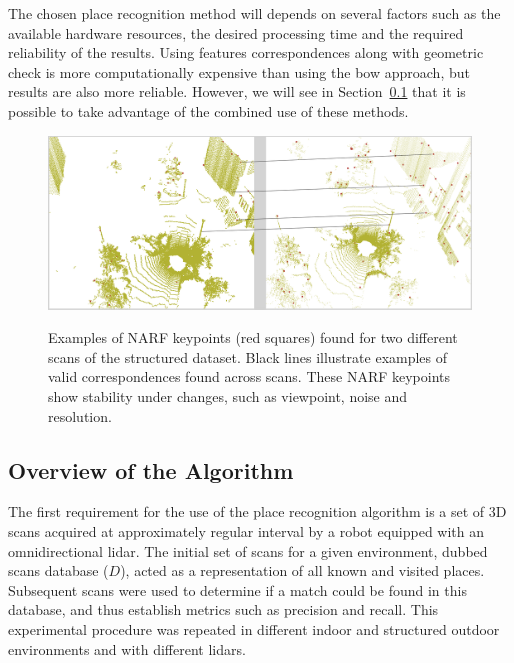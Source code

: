 The chosen place recognition method will depends on several factors such as the available hardware resources, the desired processing time and the required reliability of the results. Using features correspondences along with geometric check is more computationally expensive than using the \gls*{bow} approach, but results are also more reliable. However, we will see in Section~\ref{ssec:chap_slam_algo} that it is possible to take advantage of the combined use of these methods.

\begin{figure}[H]
    \centering
    \includegraphics[width=0.995\linewidth]{img/chap_slam/features_line.png}\\
    \caption[Examples of NARF keypoints found for two different scans with examples of correspondences.]{Examples of NARF keypoints (red squares) found for two different scans of the structured dataset. Black lines illustrate examples of valid correspondences found across scans. These NARF keypoints show stability under changes, such as viewpoint, noise and resolution.}
    \label{fig:chap_slam_features_correspondences}
\end{figure}


\subsection{Overview of the Algorithm}
\label{ssec:chap_slam_algo}

The first requirement for the use of the place recognition algorithm is a set of 3D scans acquired at approximately regular interval by a robot equipped with an omnidirectional \gls*{lidar}. The initial set of scans for a given environment, dubbed scans database ($D$), acted as a representation of all known and visited places. Subsequent scans were used to determine if a match could be found in this database, and thus establish metrics such as precision and recall. This experimental procedure was repeated in different indoor and structured outdoor environments and with different \gls*{lidar}s.

